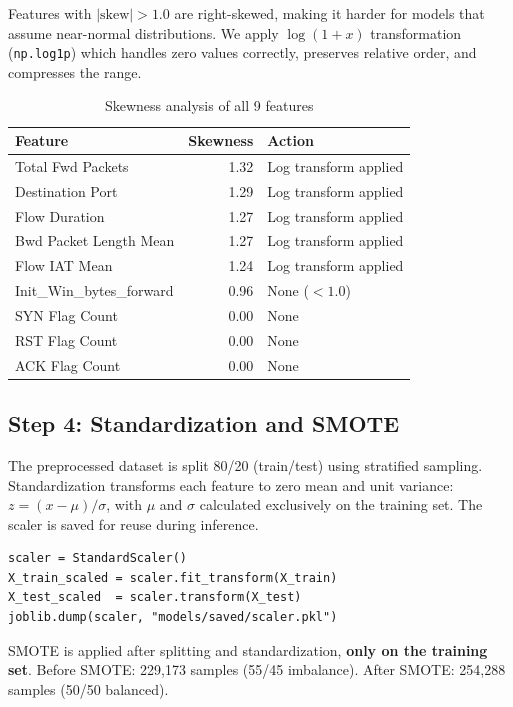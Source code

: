 \documentclass[12pt,a4paper]{report}
\begin{document}
Features with $|\text{skew}| > 1.0$ are right-skewed, making it harder for models that assume near-normal distributions. We apply $\log(1+x)$ transformation (\texttt{np.log1p}) which handles zero values correctly, preserves relative order, and compresses the range.

\begin{table}[H]
\centering
\caption{Skewness analysis of all 9 features}
\label{tab:skewness}
\begin{tabular}{lrl}
\toprule
\textbf{Feature} & \textbf{Skewness} & \textbf{Action} \\
\midrule
Total Fwd Packets & 1.32 & Log transform applied \\
Destination Port & 1.29 & Log transform applied \\
Flow Duration & 1.27 & Log transform applied \\
Bwd Packet Length Mean & 1.27 & Log transform applied \\
Flow IAT Mean & 1.24 & Log transform applied \\
Init\_Win\_bytes\_forward & 0.96 & None ($< 1.0$) \\
SYN Flag Count & 0.00 & None \\
RST Flag Count & 0.00 & None \\
ACK Flag Count & 0.00 & None \\
\bottomrule
\end{tabular}
\end{table}

\subsection{Step 4: Standardization and SMOTE}\label{sec:smote}

The preprocessed dataset is split 80/20 (train/test) using stratified sampling. Standardization transforms each feature to zero mean and unit variance: $z = (x - \mu) / \sigma$, with $\mu$ and $\sigma$ calculated exclusively on the training set. The scaler is saved for reuse during inference.

\begin{lstlisting}[caption={Standardization with anti-leakage control}]
scaler = StandardScaler()
X_train_scaled = scaler.fit_transform(X_train)
X_test_scaled  = scaler.transform(X_test)
joblib.dump(scaler, "models/saved/scaler.pkl")
\end{lstlisting}

SMOTE is applied after splitting and standardization, \textbf{only on the training set}. Before SMOTE: 229,173 samples (55/45 imbalance). After SMOTE: 254,288 samples (50/50 balanced).
\end{document}
